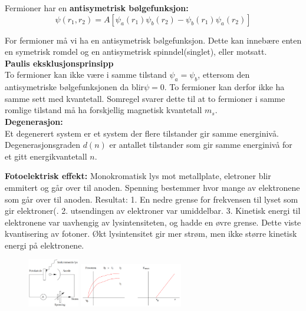 \documentclass[10p,a4paper]{article}
\begin{document}
Fermioner har en \textbf{antisymetrisk bølgefunksjon:}
\[ \psi(r_1,r_2) = A[\psi_a(r_1)\psi_b(r_2) - \psi_b(r_1)\psi_a(r_2)] \]

For fermioner må vi ha en antisymetrisk bølgefunksjon. Dette kan innebære enten en symetrisk romdel og en antisymetrisk spinndel(singlet), eller motsatt.
\\

\textbf{Paulis eksklusjonsprinsipp}\\
To fermioner kan ikke være i samme tilstand $\psi_a = \psi_b$, ettersom den antisymetriske bølgefunksjonen da blir$\psi = 0$. To fermioner kan derfor ikke ha samme sett med kvantetall. Somregel svarer dette til at to fermioner i samme romlige tilstand må ha forskjellig magnetisk kvantetall $m_s$.
\\

\textbf{Degenerasjon:}\\
Et degenerert system er et system der flere tilstander gir samme energinivå. Degenerasjonsgraden $d(n)$ er antallet tilstander som gir samme energinivå for et gitt energikvantetall $n$.

\newpage

\textbf{Fotoelektrisk effekt:} Monokromatisk lys mot metallplate, eletroner blir emmitert og går over til anoden. Spenning bestemmer hvor mange av elektronene som går over til anoden. Resultat: 1. En nedre grense for frekvensen til lyset som gir elektroner(. 2. utsendingen av elektroner var umiddelbar. 3. Kinetisk energi til elektronene var uavhengig av lysintensiteten, og hadde en øvre grense. Dette viste kvantisering av fotoner. Økt lysintensitet gir mer strøm, men ikke større kinetisk energi på elektronene.
\begin{figure}[H]
\centering
\includegraphics[width=0.2\textwidth]{foto.png}
\includegraphics[width=0.4\textwidth]{foto2.png}
\end{figure}
\end{document}
